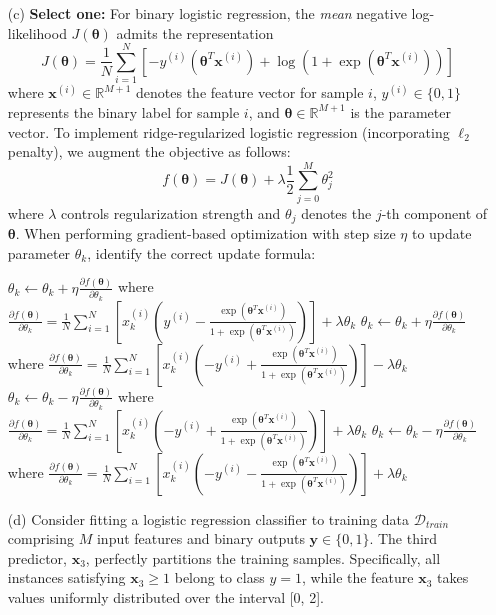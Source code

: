 \documentclass[11pt,addpoints,answers]{exam}
\newcommand{\xv}{\mathbf{x}}
\newcommand{\yv}{\mathbf{y}}
\newcommand{\thetav}{\boldsymbol{\theta}}
\newcommand{\sone}{\textbf{Select one: }}
\begin{document}
\begin{enumerate}
\begin{enumerate}[label=\alph*), itemsep=10pt]
			\item[(c)] \sone For binary logistic regression, the \emph{mean} negative log-likelihood $J(\thetav)$ admits the representation
			$$J(\thetav) = \frac{1}{N}\sum_{i=1}^N  \left[-y^{(i)}\left(\thetav^T \xv^{\left(i\right)}\right)+\log\left(1+\exp(\thetav^T \xv^{\left(i\right)})\right)\right]$$
			where $\xv^{(i)}\in \mathbb{R}^{M+1}$ denotes the feature vector for sample $i$, $y^{(i)}\in\{0, 1\}$ represents the binary label for sample $i$, and $\thetav\in\mathbb{R}^{M+1}$ is the parameter vector. To implement ridge-regularized logistic regression (incorporating $\ell_2$ penalty), we augment the objective as follows:
			$$ f(\thetav) = J(\thetav) + \lambda \frac{1}{2}\sum_{j=0}^M \theta_j^2$$
			where $\lambda$ controls regularization strength and $\theta_j$ denotes the $j$-th component of $\thetav$. When performing gradient-based optimization with step size $\eta$ to update parameter $\theta_k$, identify the correct update formula:
			
			\begin{checkboxes}
				\choice 
				$\theta_k\leftarrow \theta_k + \eta \frac{\partial f(\thetav)}{\partial \theta_k}$ where 
				$ \frac{\partial f(\thetav)}{\partial \theta_k}=\frac{1}{N}\sum_{i=1}^N \left[x^{(i)}_k\left(y^{(i)} -\frac{\exp(\thetav^T \xv^{(i)})}{1+\exp(\thetav^T \xv^{(i)})} \right)\right]+\lambda \theta_k$
				\choice 
				$\theta_k\leftarrow \theta_k + \eta \frac{\partial f(\thetav)}{\partial \theta_k}$ where 
				$ \frac{\partial f(\thetav)}{\partial \theta_k}=\frac{1}{N}\sum_{i=1}^N \left[x^{(i)}_k\left(-y^{(i)} +\frac{\exp(\thetav^T \xv^{(i)})}{1+\exp(\thetav^T \xv^{(i)})} \right)\right]-\lambda \theta_k$
				\choice 
				$\theta_k\leftarrow \theta_k - \eta \frac{\partial f(\thetav)}{\partial \theta_k}$ where 
				$ \frac{\partial f(\thetav)}{\partial \theta_k}=\frac{1}{N}\sum_{i=1}^N \left[x^{(i)}_k\left(-y^{(i)} +\frac{\exp(\thetav^T \xv^{(i)})}{1+\exp(\thetav^T \xv^{(i)})} \right)\right]+\lambda \theta_k$
				\choice
				$\theta_k\leftarrow \theta_k - \eta \frac{\partial f(\thetav)}{\partial \theta_k}$ where 
				$ \frac{\partial f(\thetav)}{\partial \theta_k}=\frac{1}{N}\sum_{i=1}^N \left[x^{(i)}_k\left(-y^{(i)} -\frac{\exp(\thetav^T \xv^{(i)})}{1+\exp(\thetav^T \xv^{(i)})} \right)\right]+\lambda \theta_k$
			\end{checkboxes}
			
			\vspace*{1.2cm}
			
			\item[(d)] Consider fitting a logistic regression classifier to training data $\mathcal{D}_{train}$ comprising $M$ input features and binary outputs $\yv \in \{0, 1\}$. The third predictor, $\xv_3$, perfectly partitions the training samples. Specifically, all instances satisfying $\xv_3 \geq 1$ belong to class $y=1$, while the feature $\xv_3$ takes values uniformly distributed over the interval [0, 2].
			

\end{enumerate}
\end{enumerate}
\end{document}
